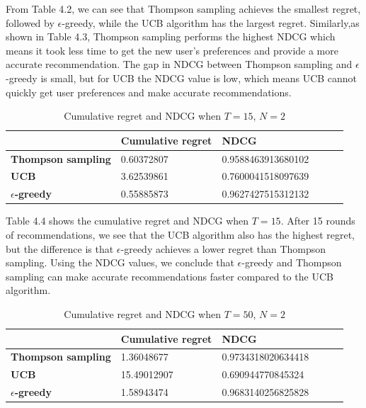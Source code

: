 From Table 4.2, we can see that Thompson sampling achieves the smallest regret, followed by $\epsilon$-greedy, while the UCB algorithm has the largest regret. Similarly,as shown in Table 4.3, Thompson sampling performs the highest NDCG which means it took less time to get the new user's preferences and provide a more accurate recommendation. The gap in NDCG between Thompson sampling and $\epsilon$-greedy is small, but for UCB the NDCG value is low, which means UCB cannot quickly get user preferences and make accurate recommendations.

\begin{table}[htbp]
\centering
\begin{tabular}{llllll}
\hline
                  & Cumulative regret & NDCG   \\ \hline
\textbf{Thompson sampling} &0.60372807               &  0.9588463913680102  \\
\textbf{UCB }              & 3.62539861 &0.7600041518097639 \\
\textbf{$\epsilon$-greedy }& 0.55885873 &0.9627427515312132
\end{tabular}
\caption{Cumulative regret and NDCG when $T=15$, $N=2$}
\end{table}
Table 4.4 shows the cumulative regret and NDCG when $T = 15$. After 15 rounds of recommendations, we see that the UCB algorithm also has the highest regret, but the difference is that $\epsilon$-greedy achieves a lower regret than Thompson sampling. Using the NDCG values, we conclude that $\epsilon$-greedy and Thompson sampling can make accurate recommendations faster compared to the UCB algorithm.
\begin{table}[htbp]
\centering
\begin{tabular}{llllll}
\hline
                  & Cumulative regret & NDCG   \\ \hline
\textbf{Thompson sampling} &1.36048677               &   0.9734318020634418  \\
\textbf{UCB }              & 15.49012907 &0.690944770845324 \\
\textbf{$\epsilon$-greedy }& 1.58943474 &0.9683140256825828
\end{tabular}
\caption{Cumulative regret and NDCG when $T=50$, $N=2$}
\end{table}

